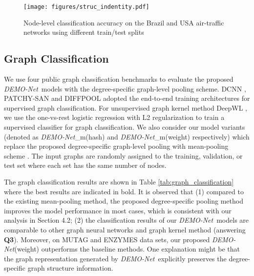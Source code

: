 \documentclass[sigconf]{acmart}
\newcommand{\demonet}{{\emph {DEMO-Net}}}
\begin{document}
\begin{figure}[t]
\texttt{[image: figures/struc\_indentity.pdf]}
\caption{Node-level classification accuracy on the Brazil and USA air-traffic networks using different train/test splits}
\label{struc_indentity}
\vspace{-4mm}
\end{figure}

\subsection{Graph Classification}
We use four public graph classification benchmarks to evaluate the proposed \demonet\ models with the degree-specific graph-level pooling scheme. DCNN \cite{atwood2016diffusion}, PATCHY-SAN \cite{niepert2016learning} and DIFFPOOL \cite{ying2018hierarchical} adopted the end-to-end training architectures for supervised graph classification. For unsupervised graph kernel method DeepWL \cite{yanardag2015deep}, we use the one-vs-rest logistic regression with L2 regularization to train a supervised classifier for graph classification. We also consider our model variants (denoted as \demonet\_m(hash) and \demonet\_m(weight) respectively) which replace the proposed degree-specific graph-level pooling with mean-pooling scheme \cite{atwood2016diffusion}. The input graphs are randomly assigned to the training, validation, or test set where each set has the same number of nodes.

The graph classification results are shown in Table \ref{tab:graph_classification} where the best results are indicated in bold. It is observed that (1) compared to the existing mean-pooling method, the proposed degree-specific pooling method improves the model performance in most cases, which is consistent with our analysis in Section 4.2; (2) the classification results of our \demonet\ models are comparable to other graph neural networks and graph kernel method (answering \textbf{Q3}). Moreover, on MUTAG and ENZYMES data sets, our proposed \demonet (weight) outperforms the baseline methods. One explanation might be that the graph representation generated by \demonet\ explicitly preserves the degree-specific graph structure information.
\end{document}
